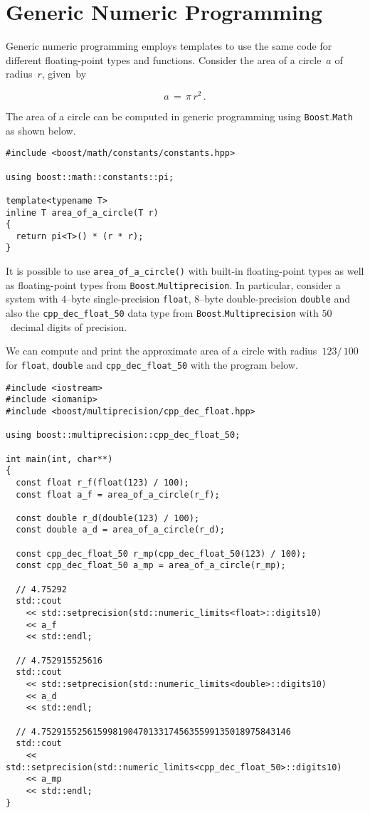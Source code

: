 \documentclass{article}[11pt,draft]
\begin{document}
\section{Generic Numeric Programming}

Generic numeric programming employs templates
to use the same code for different floating-point
types and functions. Consider the area of a circle~$a$
of radius~$r$, given~by

\begin{equation}
a\,=\,\pi\, r^{2}\,{\text{.}}
\end{equation}

The area of a circle can be computed in generic programming
using {\lstinline|Boost|}.{\lstinline|Math|} as shown below.

\begin{lstlisting}
#include <boost/math/constants/constants.hpp>

using boost::math::constants::pi;

template<typename T>
inline T area_of_a_circle(T r)
{
  return pi<T>() * (r * r);
}
\end{lstlisting}

It is possible to use {\lstinline|area_of_a_circle()|}
with built-in floating-point types as well as floating-point
types from {\lstinline|Boost|}.{\lstinline|Multiprecision|}.
In particular, consider a system with $4$--byte single-precision
{\lstinline|float|}, $8$--byte double-precision {\lstinline|double|}
and also the {\lstinline|cpp_dec_float_50|} data type
from {\lstinline|Boost|}.{\lstinline|Multiprecision|}
with $50$~decimal digits of precision.

We can compute and print the approximate area of a circle with
radius~$123/\,100$ for {\lstinline|float|}, {\lstinline|double|}
and {\lstinline|cpp_dec_float_50|} with the program below.

\begin{lstlisting}
#include <iostream>
#include <iomanip>
#include <boost/multiprecision/cpp_dec_float.hpp>

using boost::multiprecision::cpp_dec_float_50;

int main(int, char**)
{
  const float r_f(float(123) / 100);
  const float a_f = area_of_a_circle(r_f);

  const double r_d(double(123) / 100);
  const double a_d = area_of_a_circle(r_d);

  const cpp_dec_float_50 r_mp(cpp_dec_float_50(123) / 100);
  const cpp_dec_float_50 a_mp = area_of_a_circle(r_mp);

  // 4.75292
  std::cout
    << std::setprecision(std::numeric_limits<float>::digits10)
    << a_f
    << std::endl;

  // 4.752915525616
  std::cout
    << std::setprecision(std::numeric_limits<double>::digits10)
    << a_d
    << std::endl;

  // 4.7529155256159981904701331745635599135018975843146
  std::cout
    << std::setprecision(std::numeric_limits<cpp_dec_float_50>::digits10)
    << a_mp
    << std::endl;
}
\end{lstlisting}
\end{document}
